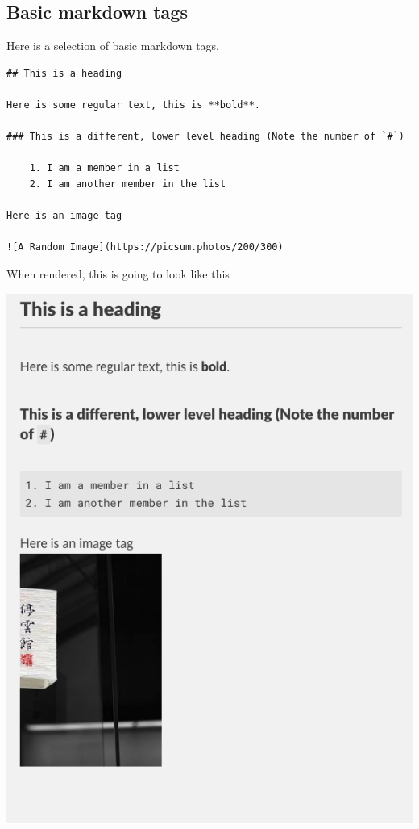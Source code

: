 \documentclass[
]{book}
\begin{document}
\hypertarget{basic-markdown-tags}{%
\subsection{Basic markdown tags}\label{basic-markdown-tags}}

Here is a selection of basic markdown tags.

\begin{verbatim}
## This is a heading

Here is some regular text, this is **bold**.

### This is a different, lower level heading (Note the number of `#`)

    1. I am a member in a list
    2. I am another member in the list

Here is an image tag

![A Random Image](https://picsum.photos/200/300)
\end{verbatim}

When rendered, this is going to look like this

\includegraphics{fig/simple_md.png}
\end{document}
